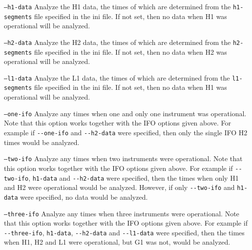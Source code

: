 \begin{entry}
\begin{entry}
\item[\texttt{--h1-data}] Analyze the H1 data, the times of which are
determined from the \verb$h1-segments$ file specified in the ini file.  If not
set, then no data when H1 was operational will be analyzed.
\end{entry}

\begin{entry}
\item[\texttt{--h2-data}] Analyze the H2 data, the times of which are
determined from the \verb$h2-segments$ file specified in the ini file.  If not
set, then no data when H2 was operational will be analyzed.
\end{entry}

\begin{entry}
\item[\texttt{--l1-data}] Analyze the L1 data, the times of which are
determined from the \verb$l1-segments$ file specified in the ini file.  If not
set, then no data when H1 was operational will be analyzed.
\end{entry}

\begin{entry}
\item[\texttt{--one-ifo}] Analyze any times when one and only one instrument
was operational.  Note that this option works together with the IFO options
given above.  For example if \verb$--one-ifo$ and \verb$--h2-data$ were
specified, then only the single IFO H2 times would be analyzed.
\end{entry}

\begin{entry}
\item[\texttt{--two-ifo}] Analyze any times when two instruments were
operational.  Note that this option works together with the IFO options given
above.  For example if \verb$--two-ifo$, \verb$h1-data$ and \verb$--h2-data$
were specified, then the times when only H1 and H2 were operational would be
analyzed.  However, if only \verb$--two-ifo$ and \verb$h1-data$ were
specified, no data would be analyzed.
\end{entry}

\begin{entry}
\item[\texttt{--three-ifo}] Analyze any times when three instruments were
operational.  Note that this option works together with the IFO options given
above.  For example if \verb$--three-ifo$, \verb$h1-data$, \verb$--h2-data$
and \verb$--l1-data$ were specified, then the times when H1, H2 and L1
were operational, but G1 was not, would be analyzed. 
\end{entry}


\end{entry}
